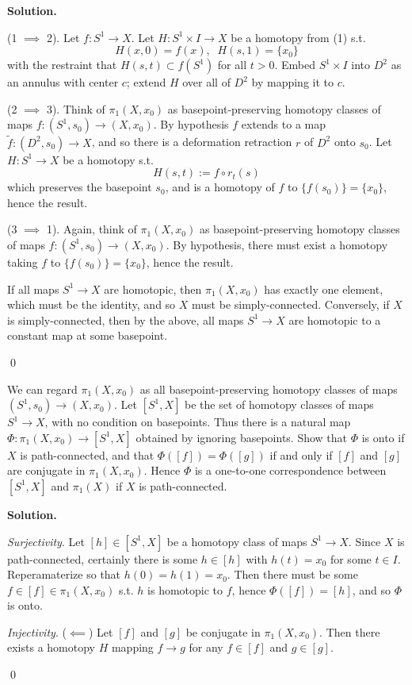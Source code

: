 \documentclass[12pt]{book}
\theoremstyle{definition}
\newenvironment{solution}
{%
  \par\noindent\textbf{Solution.}\quad
}
{%
  \qed\par
}
{
  \vspace{2pt}
}
\begin{document}
\begin{solution}

  (1 $\implies$ 2). Let $f: S^1 \to X$.
  Let $H : S^1 \times I \to X$ be a homotopy from (1) s.t.
  \[H(x, 0) = f(x), \;\; H(s, 1) = \{x_0\}\]
  with the restraint that $H(s, t) \subset f(S^1)$ for all $t > 0$.
  Embed $S^1 \times I$ into $D^2$ as an annulus with center $c$; extend $H$ over all of $D^2$ by mapping it to $c$.

  (2 $\implies$ 3). Think of $\pi_1(X, x_0)$ as basepoint-preserving homotopy classes of maps $f: (S^1, s_0) \to (X, x_0)$.
  By hypothesis $f$ extends to a map $\tilde{f}: (D^2, s_0) \to X$, and so there is a deformation retraction $r$ of $D^2$ onto $s_0$.
  Let $H: S^1 \to X$ be a homotopy s.t. 
  \[H(s, t) := f\circ r_t(s)\]
  which preserves the basepoint $s_0$, and is a homotopy of $f$ to $\{f(s_0)\} = \{x_0\}$, hence the result.

  (3 $\implies$ 1). Again, think of $\pi_1(X, x_0)$ as basepoint-preserving homotopy classes of maps $f: (S^1, s_0) \to (X, x_0)$.
  By hypothesis, there must exist a homotopy taking $f$ to $\{f(s_0)\} = \{x_0\}$, hence the result.

  If all maps $S^1 \to X$ are homotopic, then $\pi_1(X, x_0)$ has exactly one element, which must be the identity, and 
  so $X$ must be simply-connected. 
  Conversely, if $X$ is simply-connected, then by the above, all maps $S^1 \to X$ are homotopic to a constant map 
  at some basepoint.

\end{solution}


\begin{taggedexercise}[\textcolor{red}{TODO}]

  We can regard $\pi_1(X, x_0)$ as all basepoint-preserving homotopy classes of maps $(S^1, s_0) \to (X, x_0)$.
  Let $[S^1, X]$ be the set of homotopy classes of maps $S^1 \to X$, with no condition on basepoints.
  Thus there is a natural map $\Phi : \pi_1(X, x_0) \to [S^1, X]$ obtained by ignoring basepoints.
  Show that $\Phi$ is onto if $X$ is path-connected, and that $\Phi([f]) = \Phi([g])$ if and only if 
  $[f]$ and $[g]$ are conjugate in $\pi_1(X, x_0)$.
  Hence $\Phi$ is a one-to-one correspondence between $[S^1, X]$ and $\pi_1(X)$ if $X$ is path-connected.  

\end{taggedexercise}

\begin{solution}
  
  \textit{Surjectivity}. Let $[h] \in [S^1, X]$ be a homotopy class of maps $S^1 \to X$. 
  Since $X$ is path-connected, certainly there is some $h \in [h]$ with $h(t) = x_0$ for some $t \in I$.
  Reperamaterize so that $h(0) = h(1) = x_0$.
  Then there must be some $f \in [f] \in \pi_1(X, x_0)$ s.t. $h$ is homotopic to $f$, hence $\Phi([f]) = [h]$, and so
  $\Phi$ is onto.

  \textit{Injectivity}. ($\impliedby$) Let $[f]$ and $[g]$ be conjugate in $\pi_1(X, x_0)$.
  Then there exists a homotopy $H$ mapping $f \to g$ for any $f \in [f]$ and $g \in [g]$.


\end{solution}
\end{document}
